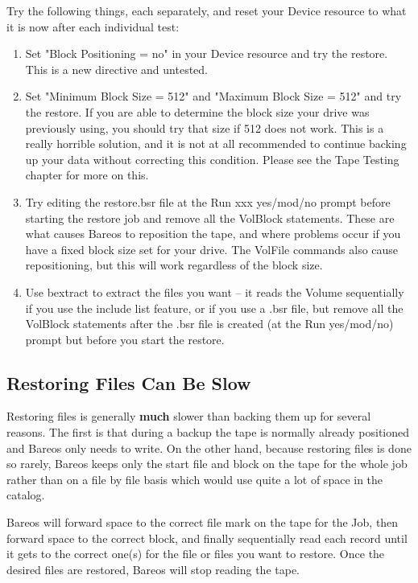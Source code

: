 Try the following things, each separately, and reset your Device resource to
what it is now after each individual test:

\begin{enumerate}
\item Set "Block Positioning = no" in your Device resource  and try the
   restore. This is a new directive and untested.

\item Set "Minimum Block Size = 512" and "Maximum  Block Size = 512" and
   try the restore.  If you are able to determine the block size your drive
   was previously using, you should try that size if 512 does not work.
   This is a really horrible solution, and it is not at all recommended
   to continue backing up your data without correcting this condition.
   Please see the Tape Testing chapter for more on this.

\item Try editing the restore.bsr file at the Run xxx yes/mod/no prompt
   before starting the restore job and remove all the VolBlock statements.
   These are what causes Bareos to reposition the tape, and where problems
   occur if you have a fixed block size set for your drive.  The VolFile
   commands also cause repositioning, but this will work regardless of the
   block size.

\item Use bextract to extract the files you want -- it reads the  Volume
   sequentially if you use the include list feature, or if you use a .bsr
   file, but remove all the VolBlock statements after the .bsr file is
   created (at the Run yes/mod/no) prompt but before you start the restore.
\end{enumerate}


\subsection{Restoring Files Can Be Slow}


Restoring files is generally {\bf much} slower than backing them up for several
reasons. The first is that during a backup the tape is normally already
positioned and Bareos only needs to write. On the other hand, because restoring
files is done so rarely, Bareos keeps only the start file and block on the
tape for the whole job rather than on a file by file basis which would use
quite a lot of space in the catalog.

Bareos will forward space to the correct file mark on the tape for the Job,
then forward space to the correct block, and finally sequentially read each
record until it gets to the correct one(s) for the file or files you want to
restore. Once the desired files are restored, Bareos will stop reading the
tape.

